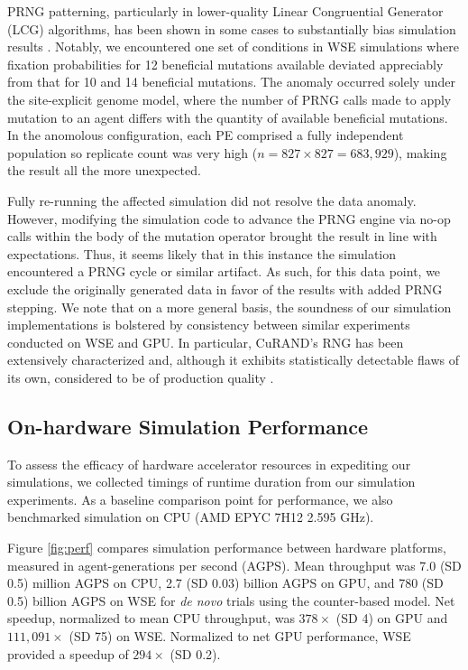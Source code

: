 PRNG patterning, particularly in lower-quality Linear Congruential Generator (LCG) algorithms, has been shown in some cases to substantially bias simulation results \citep{click2010quality}.
Notably, we encountered one set of conditions in WSE simulations where fixation probabilities for 12 beneficial mutations available deviated appreciably from that for 10 and 14 beneficial mutations.
The anomaly occurred solely under the site-explicit genome model, where the number of PRNG calls made to apply mutation to an agent differs with the quantity of available beneficial mutations.
In the anomolous configuration, each PE comprised a fully independent population so replicate count was very high ($n = 827 \times 827 = 683,929$), making the result all the more unexpected.

Fully re-running the affected simulation did not resolve the data anomaly.
However, modifying the simulation code to advance the PRNG engine via no-op calls within the body of the mutation operator brought the result in line with expectations.
Thus, it seems likely that in this instance the simulation encountered a PRNG cycle or similar artifact.
As such, for this data point, we exclude the originally generated data in favor of the results with added PRNG stepping.
We note that on a more general basis, the soundness of our simulation implementations is bolstered by consistency between similar experiments conducted on WSE and GPU.
In particular, CuRAND's RNG has been extensively characterized and, although it exhibits statistically detectable flaws of its own, considered to be of production quality \citep{nvidia2024curand}.

\subsection{On-hardware Simulation Performance}
\label{sec:performance}



To assess the efficacy of hardware accelerator resources in expediting our simulations, we collected timings of runtime duration from our simulation experiments.
As a baseline comparison point for performance, we also benchmarked simulation on CPU (AMD EPYC 7H12 2.595 GHz).

Figure \ref{fig:perf} compares simulation performance between hardware platforms, measured in agent-generations per second (AGPS).
Mean throughput was 7.0 (SD 0.5) million AGPS on CPU, 2.7 (SD 0.03) billion AGPS on GPU, and 780 (SD 0.5) billion AGPS on WSE for \textit{de novo} trials using the counter-based model.
Net speedup, normalized to mean CPU throughput, was $378\times$ (SD 4) on GPU and $111,091\times$ (SD 75) on WSE.
Normalized to net GPU performance, WSE provided a speedup of $294\times$ (SD 0.2).


